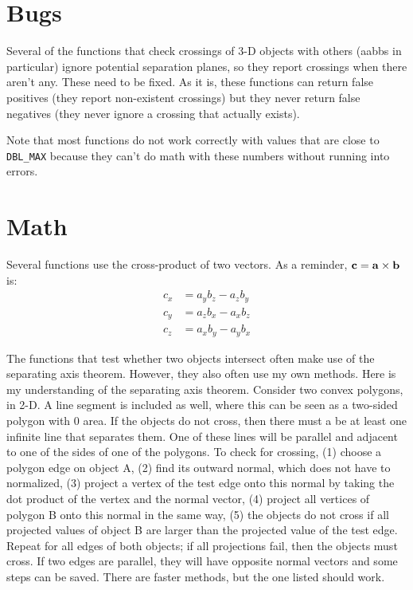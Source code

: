 \documentclass[11pt]{article}
\newcommand {\ttt} {\texttt}
\begin{document}
\section{Bugs}

Several of the functions that check crossings of 3-D objects with others (aabbs in particular) ignore potential separation planes, so they report crossings when there aren't any. These need to be fixed. As it is, these functions can return false positives (they report non-existent crossings) but they never return false negatives (they never ignore a crossing that actually exists).

Note that most functions do not work correctly with values that are close to \ttt{DBL\_MAX} because they can't do math with these numbers without running into errors.

\section{Math}

Several functions use the cross-product of two vectors. As a reminder, $\vb{c}=\vb{a} \times \vb{b}$ is:
\begin{align*}
c_x &= a_y b_z - a_z b_y\\
c_y &= a_z b_x - a_x b_z\\
c_z &= a_x b_y - a_y b_x
\end{align*}

The functions that test whether two objects intersect often make use of the separating axis theorem. However, they also often use my own methods. Here is my understanding of the separating axis theorem. Consider two convex polygons, in 2-D. A line segment is included as well, where this can be seen as a two-sided polygon with 0 area. If the objects do not cross, then there must a be at least one infinite line that separates them. One of these lines will be parallel and adjacent to one of the sides of one of the polygons. To check for crossing, (1) choose a polygon edge on object A, (2) find its outward normal, which does not have to normalized, (3) project a vertex of the test edge onto this normal by taking the dot product of the vertex and the normal vector, (4) project all vertices of polygon B onto this normal in the same way, (5) the objects do not cross if all projected values of object B are larger than the projected value of the test edge. Repeat for all edges of both objects; if all projections fail, then the objects must cross. If two edges are parallel, they will have opposite normal vectors and some steps can be saved. There are faster methods, but the one listed should work.
\end{document}
